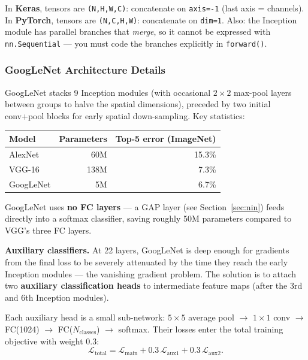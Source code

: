 \documentclass[11pt,a4paper]{article}
\newcommand{\term}[1]{\textcolor{DefGreen}{\textbf{#1}}\index{#1}}
\begin{document}
\begin{warnbox}
In \textbf{Keras}, tensors are \texttt{(N,H,W,C)}: concatenate on \texttt{axis=-1} (last axis =
channels).  In \textbf{PyTorch}, tensors are \texttt{(N,C,H,W)}: concatenate on \texttt{dim=1}.
Also: the Inception module has parallel branches that \emph{merge}, so it cannot be expressed
with \texttt{nn.Sequential} — you must code the branches explicitly in \texttt{forward()}.
\end{warnbox}

\subsubsection{GoogLeNet Architecture Details}

GoogLeNet stacks 9 Inception modules (with occasional $2\times2$ max-pool layers between groups
to halve the spatial dimensions), preceded by two initial conv+pool blocks for early
spatial down-sampling.  Key statistics:

\begin{center}
\renewcommand{\arraystretch}{1.25}
\begin{tabular}{@{}lrr@{}}
\toprule
\textbf{Model} & \textbf{Parameters} & \textbf{Top-5 error (ImageNet)} \\
\midrule
AlexNet   & 60M  & 15.3\% \\
VGG-16    & 138M & 7.3\%  \\
GoogLeNet & 5M   & 6.7\%  \\
\bottomrule
\end{tabular}
\end{center}

GoogLeNet uses \textbf{no FC layers} — a GAP layer (see Section~\ref{sec:nin}) feeds directly
into a softmax classifier, saving roughly 50M parameters compared to VGG's three FC layers.

\textbf{Auxiliary classifiers.}
At 22 layers, GoogLeNet is deep enough for gradients from the final loss to be severely
attenuated by the time they reach the early Inception modules — the vanishing gradient problem.
The solution is to attach two \term{auxiliary classification heads} to intermediate feature maps
(after the 3rd and 6th Inception modules).

Each auxiliary head is a small sub-network: $5\times5$ average pool $\to$ $1\times1$ conv $\to$
FC(1024) $\to$ FC($N_\text{classes}$) $\to$ softmax.  Their losses enter the total training
objective with weight 0.3:
\[
  \mathcal{L}_{\text{total}}
  = \mathcal{L}_{\text{main}}
  + 0.3\,\mathcal{L}_{\text{aux1}}
  + 0.3\,\mathcal{L}_{\text{aux2}}.
\]
\end{document}
